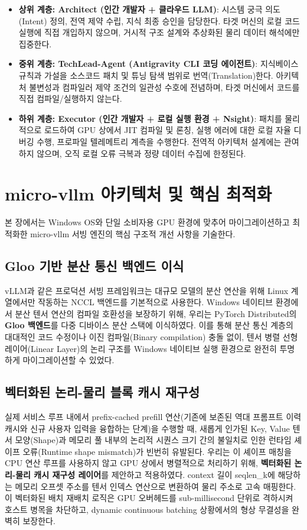 \documentclass[preprint]{kcc} %
\begin{document}
\begin{itemize}
    \item \textbf{상위 계층: Architect (인간 개발자 + 클라우드 LLM)}: 시스템 궁극 의도(Intent) 정의, 전역 제약 수립, 지식 최종 승인을 담당한다. 타겟 머신의 로컬 코드 실행에 직접 개입하지 않으며, 거시적 구조 설계와 추상화된 물리 데이터 해석에만 집중한다.
    \item \textbf{중위 계층: TechLead-Agent (Antigravity CLI 코딩 에이전트)}: 지식베이스 규칙과 가설을 소스코드 패치 및 튜닝 탐색 범위로 번역(Translation)한다. 아키텍처 불변성과 컴파일러 제약 조건의 일관성 수호에 전념하며, 타겟 머신에서 코드를 직접 컴파일/실행하지 않는다.
    \item \textbf{하위 계층: Executor (인간 개발자 + 로컬 실행 환경 + Nsight)}: 패치를 물리적으로 로드하여 GPU 상에서 JIT 컴파일 및 론칭, 실행 에러에 대한 로컬 자율 디버깅 수행, 프로파일 텔레메트리 계측을 수행한다. 전역적 아키텍처 설계에는 관여하지 않으며, 오직 로컬 오류 극복과 정량 데이터 수집에 한정된다.
\end{itemize}


\section{micro-vllm 아키텍처 및 핵심 최적화}
본 장에서는 Windows OS와 단일 소비자용 GPU 환경에 맞추어 마이그레이션하고 최적화한 micro-vllm 서빙 엔진의 핵심 구조적 개선 사항을 기술한다.

\subsection{Gloo 기반 분산 통신 백엔드 이식}
vLLM과 같은 프로덕션 서빙 프레임워크는 대규모 모델의 분산 연산을 위해 Linux 계열에서만 작동하는 NCCL 백엔드를 기본적으로 사용한다. Windows 네이티브 환경에서 분산 텐서 연산의 컴파일 호환성을 보장하기 위해, 우리는 PyTorch Distributed의 \textbf{Gloo 백엔드}를 다중 디바이스 분산 스택에 이식하였다. 이를 통해 분산 통신 계층의 대대적인 코드 수정이나 이진 컴파일(Binary compilation) 충돌 없이, 텐서 병렬 선형 레이어(Linear Layer)의 논리 구조를 Windows 네이티브 실행 환경으로 완전히 투명하게 마이그레이션할 수 있었다.

\subsection{벡터화된 논리-물리 블록 캐시 재구성}
실제 서비스 루프 내에서 prefix-cached prefill 연산(기존에 보존된 역대 프롬프트 이력 캐시와 신규 사용자 입력을 융합하는 단계)을 수행할 때, 새롭게 인가된 Key, Value 텐서 모양(Shape)과 메모리 풀 내부의 논리적 시퀀스 크기 간의 불일치로 인한 런타임 셰이프 오류(Runtime shape mismatch)가 빈번히 유발된다.
우리는 이 셰이프 매칭을 CPU 연산 루프를 사용하지 않고 GPU 상에서 병렬적으로 처리하기 위해, \textbf{벡터화된 논리-물리 캐시 재구성 레이어}를 제안하고 적용하였다. context 길이 seqlen\_k에 해당하는 메모리 오프셋 주소를 텐서 인덱스 연산으로 변환하여 물리 주소로 고속 매핑한다. 이 벡터화된 배치 재배치 로직은 GPU 오버헤드를 sub-millisecond 단위로 격하시켜 호스트 병목을 차단하고, dynamic continuous batching 상황에서의 형상 무결성을 완벽히 보장한다.
\end{document}

